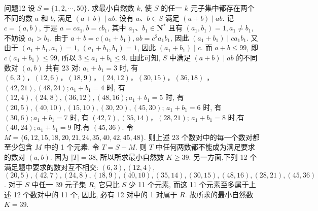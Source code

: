 问题12 设 $S=\{1,2, \cdots, 50\}$. 求最小自然数 $k$, 使 $S$ 的任一 $k$ 元子集中都存在两个不同的数 $a$ 和 $b$, 满足 $(a+b) \mid a b$.
设有 $a 、 b \in S$ 满足 $(a+b) \mid a b$. 记 $c=(a, b)$, 于是 $a=c a_1, b=c b_1$, 其中 $a_1 、 b_1 \in \mathbf{N}^*$ 且有 $\left(a_1, b_1\right)=1, a_1 \neq b_1$, 不妨设 $a_1>b_1$. 由于 $a+b= c\left(a_1+b_1\right), a b=c^2 a_1 b_1$, 因此 $\left(a_1+b_1\right) \mid c a_1 b_1$. 又由于 $\left(a_1+b_1, a_1\right)=1$, $\left(a_1+b_1, b_1\right)=1$, 因此 $\left(a_1+b_1\right) \mid c$. 而 $a+b \leqslant 99$, 即 $c\left(a_1+b_1\right) \leqslant 99$, 所以 $3 \leqslant a_1+b_1 \leqslant 9$. 由此可知, $S$ 中满足 $(a+b) \mid a b$ 的不同数对 $(a, b)$ 共有 23 对: $a_1+b_1=3$ 时, 有 $(6,3) ，(12,6) ，(18,9) ，(24,12) ，(30,15) ，(36,18)$ ， $(42,21),(48,24) ; a_1+b_1=4$ 时, 有 $(12,4),(24,8),(36,12), (48, 16) ; a_1+b_1=5$ 时, 有 $(20,5), (40,10),(15,10),(30,20),(45,30)$; $a_1+b_1=6$ 时, 有 $(30,6) ; a_1+b_1=7$ 时, 有 $(42,7),(35,14) ，(28,21)$; $a_1+b_1=8$ 时,有 $(40,24) ; a_1+b_1=9$ 时,有 $(45,36)$.
令 $M=\{6,12,15,18,20,21,24,35,40,42,45,48\}$. 则上述 23 个数对中的每一个数对都至少包含 $M$ 中的 1 个元素.
令 $T=S-M$. 则 $T$ 中任何两数都不能成为满足要求的数对 $(a, b)$. 因为 $|T|=38$, 所以所求最小自然数 $K \geqslant 39$.
另一方面,下列 12 个满足题中要求的数对互不相交: $(6,3),(12,4)$, $(20,5),(42,7),(24,8),(18,9),(40,10),(35,14),(30,15),(48, 16),(28,21),(45,36)$. 对于 $S$ 中任一 39 元子集 $R$, 它只比 $S$ 少 11 个元素, 而这 11 个元素至多属于上述 12 个数对中的 11 个, 因此, 必有 12 对中的 1 对属于 $R$. 故所求的最小自然数 $K=39$.



